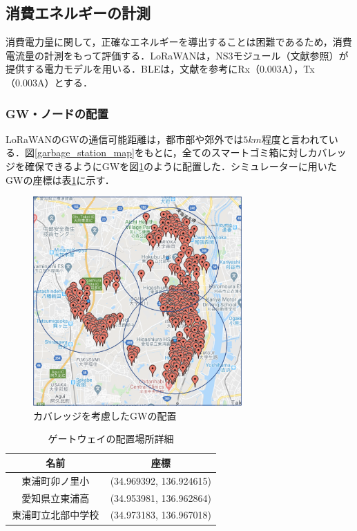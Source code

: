 \documentclass[Japanese]{dicomopapers}
\begin{document}
\subsection{消費エネルギーの計測}
消費電力量に関して，正確なエネルギーを導出することは困難であるため，消費電流量の計測をもって評価する．LoRaWANは，NS3モジュール（文献\cite{lorawan_github}参照）が提供する電力モデルを用いる．BLEは，文献\cite{ble_energy_consumption}を参考にRx（0.003A），Tx（0.003A）とする．

\subsubsection{GW・ノードの配置}
LoRaWANのGWの通信可能距離は，都市部や郊外では$5km$程度と言われている．図\ref{garbage_station_map}をもとに，全てのスマートゴミ箱に対しカバレッジを確保できるようにGWを図\ref{lorawan_area}のように配置した．シミュレーターに用いたGWの座標は表\ref{tab:gateway_position_detail}に示す．


\begin{figure}[h]
    \centering
    \includegraphics[width=8cm]{img/lorawan_area.png}
    \caption{カバレッジを考慮したGWの配置}
    \label{lorawan_area}
\end{figure}

\begin{table}[h]
    \centering
    \caption{ゲートウェイの配置場所詳細}
    \label{tab:gateway_position_detail}
    \begin{tabular}{|c|c|}
    \hline
    \textbf{名前}    & \textbf{座標} \\ \hline
    東浦町卯ノ里小 　　& (34.969392, 136.924615) \\ \hline
    愛知県立東浦高 　　& (34.953981, 136.962864) \\ \hline
    東浦町立北部中学校 & (34.973183, 136.967018) \\ \hline
    \end{tabular}
\end{table}
\end{document}
